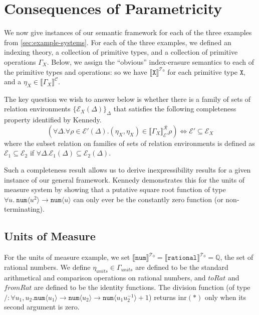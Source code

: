 \documentclass[natbib,preprint]{sigplanconf}
\newcommand{\tyPrim}[2]{\texttt{#1}\langle #2 \rangle}
\newcommand{\tyPrimNm}[1]{\texttt{#1}}
\newcommand{\relEnv}[1]{\mathcal{#1}}
\newcommand{\ctxtSem}[1]{\llbracket #1 \rrbracket^{\mathcal{C}}}
\newcommand{\tyPrimSem}[1]{\llbracket \tyPrimNm{#1} \rrbracket^{\mathcal{T}_0}}
\newcommand{\rsem}[3]{\llbracket #1 \rrbracket^{\mathcal{R}}_{#2}{#3}}
\begin{document}
\section{Consequences of Parametricity}

We now give instances of our semantic framework for each of the three
examples from \autoref{sec:example-systems}. For each of the three
examples, we defined an indexing theory, a collection of primitive
types, and a collection of primitive operations $\Gamma_X$. Below, we
assign the ``obvious'' index-erasure semantics to each of the
primitive types and operations: so we have $\tyPrimSem{X}$ for each
primitive type $\tyPrimNm{X}$, and a $\eta_X \in \ctxtSem{\Gamma_X}$.

The key question we wish to answer below is whether there is a family
of sets of relation environments $\{\relEnv{E}_X(\Delta)\}_{\Delta}$
that satisfies the following completeness property identified by
Kennedy.
\begin{equation}\label{eq:kennedy-completeness}
  (\forall \Delta. \forall \rho \in \relEnv{E}'(\Delta). (\eta_X, \eta_X) \in \rsem{\Gamma_X}{\relEnv{E}'}{\rho}) \Leftrightarrow \relEnv{E}'\subseteq \relEnv{E}_X
\end{equation}
where the subset relation on families of sets of relation environments
is defined as $\relEnv{E}_1 \subseteq \relEnv{E}_2$ if $\forall
\Delta. \relEnv{E}_1(\Delta) \subseteq \relEnv{E}_2(\Delta)$.

Such a completeness result allows us to derive inexpressibility
results for a given instance of our general framework. Kennedy
demonstrates this for the units of measure system by showing that a
putative square root function of type $\forall u.\ \tyPrim{num}{u^2}
\to \tyPrim{num}{u}$ can only ever be the constantly zero function (or
non-terminating).

\subsection{Units of Measure}\label{sec:units-semantics}

For the units of measure example, we set $\tyPrimSem{num} =
\tyPrimSem{rational} = \mathbb{Q}$, the set of rational numbers. We
define $\eta_{\mathit{units}} \in \Gamma_{\mathit{units}}$ are defined
to be the standard arithmetical and comparison operations on rational
numbers, and $\mathit{toRat}$ and $\mathit{fromRat}$ are defined to be
the identity functions. The division function (of type $/ : \forall
u_1,u_2. \tyPrim{num}{u_1} \to \tyPrim{num}{u_2} \to
\tyPrim{num}{u_1u^{-1}_2} + 1$) returns $\mathrm{inr}(*)$ only when
its second argument is zero.
\end{document}
